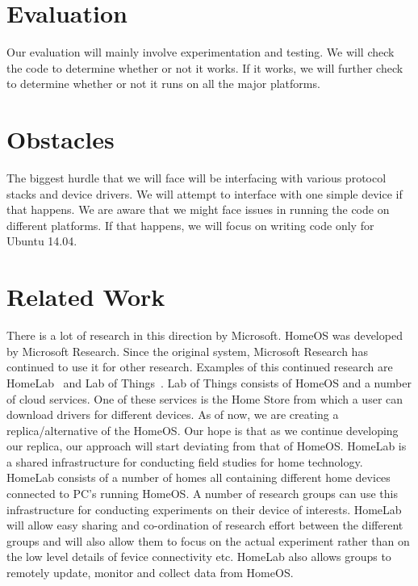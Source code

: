 \documentclass[letterpaper,12pt]{article}
\begin{document}
\section{Evaluation}
Our evaluation will mainly involve experimentation and testing. We will check the code to determine whether or not it works. If it works, we will further check to determine whether or not it runs on all the major platforms.

\section{Obstacles}
The biggest hurdle that we will face will be interfacing with various protocol stacks and device drivers. We will attempt to interface with one simple device if that happens. We are aware that we might face issues in running the code on different platforms. If that happens, we will focus on writing code only for Ubuntu 14.04.

\section{Related Work}
There is a lot of research in this direction by Microsoft.  HomeOS was developed by Microsoft Research.  Since the original system, Microsoft Research has continued to use it for other research. Examples of this continued research are HomeLab~\cite{homeLab} and Lab of Things~\cite{labOfThings}. Lab of Things consists of HomeOS and a number of cloud services. One of these services is the Home Store from which a user can download drivers for different devices. As of now, we are creating a replica/alternative of the HomeOS. Our hope is that as we continue developing our replica, our approach will start deviating from that of HomeOS. HomeLab is a shared infrastructure for conducting field studies for home technology. HomeLab consists of a number of homes all containing different home devices connected to PC's running HomeOS. A number of research groups can use this infrastructure for conducting experiments on their device of interests. HomeLab will allow easy sharing and co-ordination of research effort between the different groups and will also allow them to focus on the actual experiment rather than on the low level details of fevice connectivity etc. HomeLab also allows groups to remotely update, monitor and collect data from HomeOS.
\end{document}
